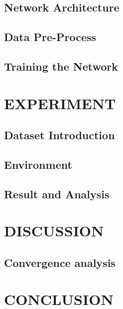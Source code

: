 \documentclass{article}
\begin{document}
	\subsection{Network Architecture}\label{subsec:network-architecture}

	\subsection{Data Pre-Process}\label{subsec:data-pre-process}

	\subsection{Training the Network}\label{subsec:training-the-network}


	\section{EXPERIMENT}\label{sec:experiment}

	\subsection{Dataset Introduction}\label{subsec:dataset-introduction}

	\subsection{Environment}\label{subsec:environment}

	\subsection{Result and Analysis}\label{subsec:result-and-analysis}


	\section{DISCUSSION}\label{sec:discussion}

	\subsection{Convergence analysis}\label{subsec:convergence}



	\section{CONCLUSION}\label{sec:conclusion}
\end{document}
